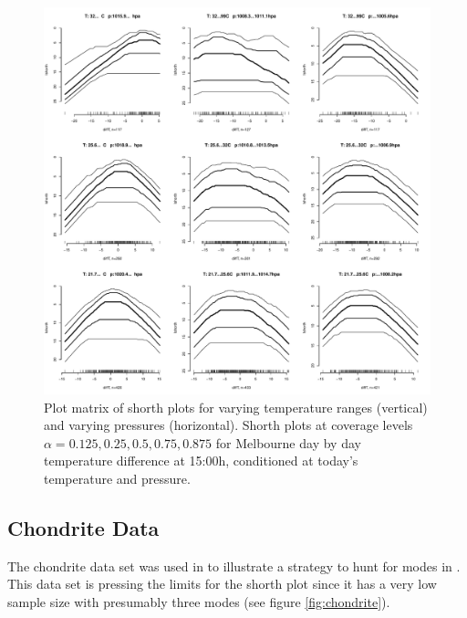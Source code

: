 \documentclass[dvips,12pt,a4paper,twoside]{amsart}
\begin{document}
\begin{figure}[htb]
\includegraphics[width=\linewidth]{TheShorthPlot-Melbourne}
\caption{Plot matrix of shorth plots for varying temperature ranges (vertical) and varying pressures (horizontal). Shorth plots at coverage levels $\alpha =0.125,0.25,0.5,0.75,  0.875$ for Melbourne day by day temperature difference at 15:00h,  conditioned at today's temperature and pressure. }\label{fig:melbourne}
\end{figure}


%
\subsection{Chondrite Data}
The  chondrite data set was used in to illustrate a strategy to hunt for modes in \cite{Good1980Density-estimat}. This data set is pressing the limits for the shorth plot since it has a very low sample size with presumably three modes  (see figure \ref{fig:chondrite}).
\end{document}
